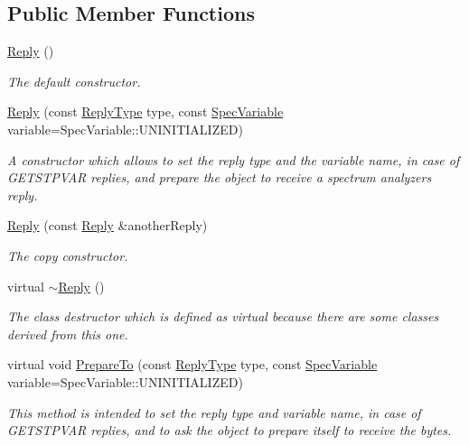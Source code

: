 \subsection*{Public Member Functions}
\begin{DoxyCompactItemize}
\item 
\mbox{\label{classReply_a48042b6ebf852fd8f0c28664eadf851e}} 
\hyperlink{classReply_a48042b6ebf852fd8f0c28664eadf851e}{Reply} ()
\begin{DoxyCompactList}\small\item\em The default constructor. \end{DoxyCompactList}\item 
\hyperlink{classReply_a4c993ea22d3674d2a337b6ca157d2bea}{Reply} (const \hyperlink{classReply_aa873dec4817ed08a5212ec3ba2b5c807}{Reply\+Type} type, const \hyperlink{Spectran_8h_a0411392c90f0c8f0d8e44a4e94259276}{Spec\+Variable} variable=Spec\+Variable\+::\+U\+N\+I\+N\+I\+T\+I\+A\+L\+I\+Z\+ED)
\begin{DoxyCompactList}\small\item\em A constructor which allows to set the reply type and the variable name, in case of {\itshape G\+E\+T\+S\+T\+P\+V\+AR} replies, and prepare the object to receive a spectrum analyzer\textquotesingle{}s reply. \end{DoxyCompactList}\item 
\hyperlink{classReply_add752285090cf6966ba993aae7056229}{Reply} (const \hyperlink{classReply}{Reply} \&another\+Reply)
\begin{DoxyCompactList}\small\item\em The copy constructor. \end{DoxyCompactList}\item 
virtual \hyperlink{classReply_a165e19cb7b393c0993d8992d47e7141d}{$\sim$\+Reply} ()
\begin{DoxyCompactList}\small\item\em The class destructor which is defined as virtual because there are some classes derived from this one. \end{DoxyCompactList}\item 
virtual void \hyperlink{classReply_a8c27c3e783dcc1ce75f709114b7e79f1}{Prepare\+To} (const \hyperlink{classReply_aa873dec4817ed08a5212ec3ba2b5c807}{Reply\+Type} type, const \hyperlink{Spectran_8h_a0411392c90f0c8f0d8e44a4e94259276}{Spec\+Variable} variable=Spec\+Variable\+::\+U\+N\+I\+N\+I\+T\+I\+A\+L\+I\+Z\+ED)
\begin{DoxyCompactList}\small\item\em This method is intended to set the reply type and variable name, in case of {\itshape G\+E\+T\+S\+T\+P\+V\+AR} replies, and to ask the object to prepare itself to receive the bytes. \end{DoxyCompactList}\item 

\end{DoxyCompactItemize}
